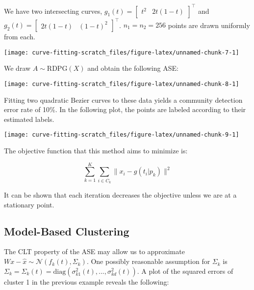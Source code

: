 \documentclass[
  11pt,
]{article}
\begin{document}
\begin{example}



We have two intersecting curves, $g_1(t) = \begin{bmatrix} t^2 & 2 t (1 - t) \end{bmatrix}^\top$ and $g_2(t) = \begin{bmatrix} 2 t (1 - t) & (1 - t) ^ 2 \end{bmatrix}^\top$. $n_1 = n_2 = 256$ points are drawn uniformly from each.


\begin{center}\texttt{[image: curve-fitting-scratch\_files/figure-latex/unnamed-chunk-7-1]} \end{center}

We draw $A \sim \mathrm{RDPG}(X)$ and obtain the following ASE:


\begin{center}\texttt{[image: curve-fitting-scratch\_files/figure-latex/unnamed-chunk-8-1]} \end{center}

Fitting two quadratic Bezier curves to these data yields a community detection error rate of 10\%. 
In the following plot, the points are labeled according to their estimated labels.


\begin{center}\texttt{[image: curve-fitting-scratch\_files/figure-latex/unnamed-chunk-9-1]} \end{center}

\end{example}

The objective function that this method aims to minimize is:

\[\sum_{k=1}^K \sum_{i \in C_k} \|x_i - g(t_i | p_k)\|^2\]

It can be shown that each iteration decreases the objective unless we
are at a stationary point.

\hypertarget{model-based-clustering}{%
\subsection{Model-Based Clustering}\label{model-based-clustering}}

The CLT property of the ASE may allow us to approximate
\(W x - \hat{x} \sim \mathcal{N}(f_k(t), \Sigma_k)\). One possibly
reasonable assumption for \(\Sigma_k\) is
\(\Sigma_k = \Sigma_k(t) = \mathrm{diag}(\sigma_{k1}^2(t), ..., \sigma_{kd}^2(t))\).
A plot of the squared errors of cluster 1 in the previous example
reveals the following:
\end{document}

